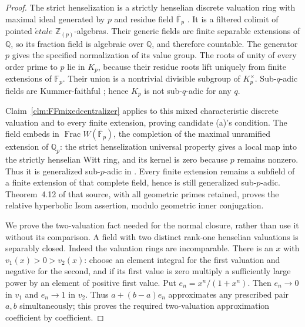 \documentclass[11pt]{article}
\begin{document}
\begin{proof}
The strict henselization is a strictly henselian discrete
valuation ring with maximal ideal generated by \(p\)
and residue field \(\overline{\mathbb F}_p\)
\citep[Lemmas~10.155.2, 15.46.11]{FF_StacksHensel}.
It is a filtered colimit of pointed \(\acute etale\)
\(\mathbb Z_{(p)}\)-algebras. Their generic fields are
finite separable extensions of \(\mathbb Q\), so its
fraction field is algebraic over \(\mathbb Q\), and
therefore countable. The generator \(p\) gives the
specified normalization of its value group. The roots of
unity of every order prime to \(p\) lie in \(K_p\),
because their residue roots lift uniquely from finite
extensions of \(\mathbb F_p\). Their union is a
nontrivial divisible subgroup of \(K_p^\times\).
Sub-\(q\)-adic fields are Kummer-faithful
\citep[Remark~3.9(2)]{FF_CS2026}; hence \(K_p\) is not
sub-\(q\)-adic for any \(q\).

Claim~\ref{clm:FFmixedcentralizer} applies to this mixed
characteristic discrete valuation and to every finite
extension, proving candidate (a)'s condition.
The field embeds in
\(\operatorname{Frac}W(\overline{\mathbb F}_p)\),
the completion of the maximal unramified extension of
\(\mathbb Q_p\): the strict henselization universal
property gives a local map into the strictly henselian
Witt ring, and its kernel is zero because \(p\) remains
nonzero. Thus it is generalized sub-\(p\)-adic
in \citet[Definition~4.11]{FF_Mochizuki2003}.
Every finite extension remains a subfield of a finite
extension of that complete field, hence is still generalized
sub-\(p\)-adic. Theorem~4.12 of that source, with all
geometric primes retained, proves the relative hyperbolic
Isom assertion, modulo geometric inner conjugation.

We prove the two-valuation fact needed for the normal
closure, rather than use it without its comparison.
A field with two distinct rank-one henselian valuations
is separably closed. Indeed the valuation rings are
incomparable. There is an \(x\) with
\(v_1(x)>0>v_2(x)\): choose an element integral for the
first valuation and negative for the second, and if its
first value is zero multiply a sufficiently large power
by an element of positive first value. Put
\(e_n=x^n/(1+x^n)\). Then \(e_n\to0\) in \(v_1\)
and \(e_n\to1\) in \(v_2\). Thus
\(a+(b-a)e_n\) approximates any prescribed pair \(a,b\)
simultaneously; this proves the required two-valuation
approximation coefficient by coefficient.


\end{proof}
\end{document}

